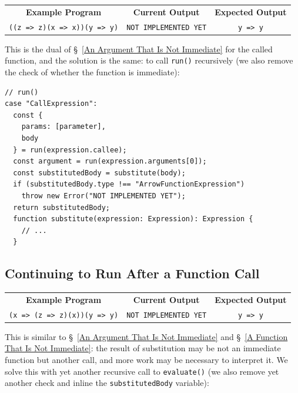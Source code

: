 \documentclass[12pt, oneside]{book}
\begin{document}
\begin{center}
\begin{tabular}{c|c|c}
\textbf{Example Program} & \textbf{Current Output} & \textbf{Expected Output} \\
\texttt{((z => z)(x => x))(y => y)} & \texttt{NOT IMPLEMENTED YET} & \texttt{y => y} \\
\end{tabular}
\end{center}

This is the dual of §~\ref{An Argument That Is Not Immediate} for the called function, and the solution is the same: to call \texttt{run()} recursively (we also remove the check of whether the function is immediate):

\begin{verbatim}
// run()
case "CallExpression":
  const {
    params: [parameter],
    body
  } = run(expression.callee);
  const argument = run(expression.arguments[0]);
  const substitutedBody = substitute(body);
  if (substitutedBody.type !== "ArrowFunctionExpression")
    throw new Error("NOT IMPLEMENTED YET");
  return substitutedBody;
  function substitute(expression: Expression): Expression {
    // ...
  }
\end{verbatim}

\subsection{Continuing to Run After a Function Call}
\label{Continuing to Run After a Function Call}

\begin{center}
\begin{tabular}{c|c|c}
\textbf{Example Program} & \textbf{Current Output} & \textbf{Expected Output} \\
\texttt{(x => (z => z)(x))(y => y)} & \texttt{NOT IMPLEMENTED YET} & \texttt{y => y} \\
\end{tabular}
\end{center}

This is similar to §~\ref{An Argument That Is Not Immediate} and §~\ref{A Function That Is Not Immediate}: the result of substitution may be not an immediate function but another call, and more work may be necessary to interpret it. We solve this with yet another recursive call to \texttt{evaluate()} (we also remove yet another check and inline the \texttt{substitutedBody} variable):
\end{document}
